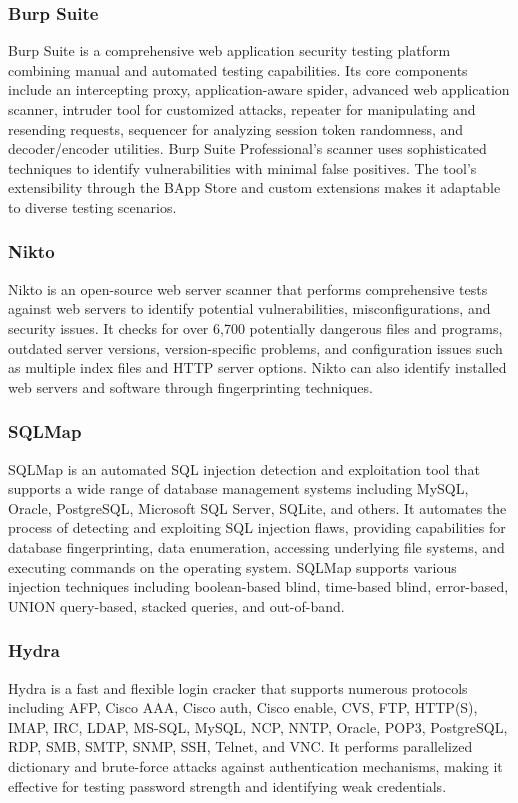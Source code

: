 \subsubsection{Burp Suite}
Burp Suite is a comprehensive web application security testing platform combining manual and automated testing capabilities. Its core components include an intercepting proxy, application-aware spider, advanced web application scanner, intruder tool for customized attacks, repeater for manipulating and resending requests, sequencer for analyzing session token randomness, and decoder/encoder utilities. Burp Suite Professional's scanner uses sophisticated techniques to identify vulnerabilities with minimal false positives. The tool's extensibility through the BApp Store and custom extensions makes it adaptable to diverse testing scenarios.

\subsubsection{Nikto}
Nikto is an open-source web server scanner that performs comprehensive tests against web servers to identify potential vulnerabilities, misconfigurations, and security issues. It checks for over 6,700 potentially dangerous files and programs, outdated server versions, version-specific problems, and configuration issues such as multiple index files and HTTP server options. Nikto can also identify installed web servers and software through fingerprinting techniques.

\subsubsection{SQLMap}
SQLMap is an automated SQL injection detection and exploitation tool that supports a wide range of database management systems including MySQL, Oracle, PostgreSQL, Microsoft SQL Server, SQLite, and others. It automates the process of detecting and exploiting SQL injection flaws, providing capabilities for database fingerprinting, data enumeration, accessing underlying file systems, and executing commands on the operating system. SQLMap supports various injection techniques including boolean-based blind, time-based blind, error-based, UNION query-based, stacked queries, and out-of-band.

\subsubsection{Hydra}
Hydra is a fast and flexible login cracker that supports numerous protocols including AFP, Cisco AAA, Cisco auth, Cisco enable, CVS, FTP, HTTP(S), IMAP, IRC, LDAP, MS-SQL, MySQL, NCP, NNTP, Oracle, POP3, PostgreSQL, RDP, SMB, SMTP, SNMP, SSH, Telnet, and VNC. It performs parallelized dictionary and brute-force attacks against authentication mechanisms, making it effective for testing password strength and identifying weak credentials.

